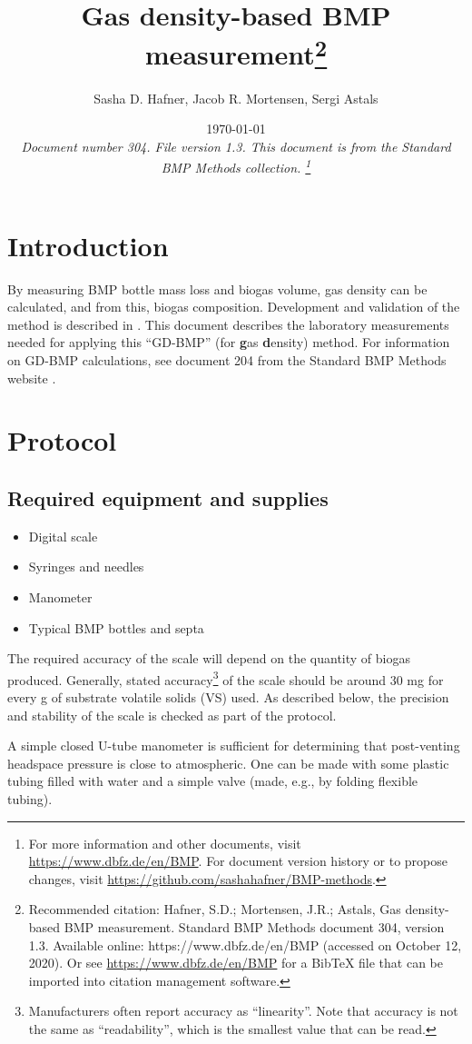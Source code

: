 \documentclass[]{article}
\title {Gas density-based BMP measurement\footnote{
  Recommended citation: 
Hafner, S.D.; Mortensen, J.R.; Astals, Gas density-based BMP measurement. Standard BMP Methods document 304, version 1.3. Available online: https://www.dbfz.de/en/BMP (accessed on October 12, 2020).
\newline
  Or see \url{https://www.dbfz.de/en/BMP} for a BibTeX file that can be imported into citation management software.
}
}
\author{Sasha D. Hafner, Jacob R. Mortensen, Sergi Astals}
\date{\today \\
\bigskip
\textit{
  Document number 304.
  File version 1.3. 
  This document is from the Standard BMP Methods collection.
    \footnote{For more information and other documents, visit \url{https://www.dbfz.de/en/BMP}. 
    For document version history or to propose changes, visit \url{https://github.com/sashahafner/BMP-methods}.}
}
}
\begin{document}
\maketitle

\section{Introduction}
By measuring BMP bottle mass loss and biogas volume, gas density can be calculated, and from this, biogas composition.
Development and validation of the method is described in \citet{justesenDevelopmentValidationLowcost2019}.
This document describes the laboratory measurements needed for applying this ``GD-BMP'' (for \textbf{g}as \textbf{d}ensity) method.
For information on GD-BMP calculations, see document 204 from the Standard BMP Methods website \citep{BMPdoc204gasdens}. 

\section{Protocol}

\subsection{Required equipment and supplies}

\begin{itemize}
    \item Digital scale
    \item Syringes and needles
    \item Manometer
    \item Typical BMP bottles and septa
\end{itemize}

The required accuracy of the scale will depend on the quantity of biogas produced. 
Generally, stated accuracy\footnote{
  Manufacturers often report accuracy as ``linearity''. 
  Note that accuracy is not the same as ``readability'', which is the smallest value that can be read. 
} of the scale should be around 30 mg for every g of substrate volatile solids (VS) used.
As described below, the precision and stability of the scale is checked as part of the protocol.

A simple closed U-tube manometer is sufficient for determining that post-venting headspace pressure is close to atmospheric.
One can be made with some plastic tubing filled with water and a simple valve (made, e.g., by folding flexible tubing).
\end{document}
